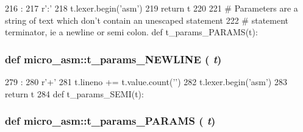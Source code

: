 \begin{DoxyCode}
216                      :
217     r':'
218     t.lexer.begin('asm')
219     return t
220 
221 # Parameters are a string of text which don't contain an unescaped statement
222 # statement terminator, ie a newline or semi colon.
def t_params_PARAMS(t):
\end{DoxyCode}
\hypertarget{namespacemicro__asm_a466b4ac51d5f9226e723240cdb1b809d}{
\subsubsection[{t\_\-params\_\-NEWLINE}]{\setlength{\rightskip}{0pt plus 5cm}def micro\_\-asm::t\_\-params\_\-NEWLINE ( {\em t})}}
\label{namespacemicro__asm_a466b4ac51d5f9226e723240cdb1b809d}



\begin{DoxyCode}
279                        :
280     r'\n+'
281     t.lineno += t.value.count('\n')
282     t.lexer.begin('asm')
283     return t
284 
def t_params_SEMI(t):
\end{DoxyCode}
\hypertarget{namespacemicro__asm_a95021a4fe487544ac75a27dd642332bc}{
\subsubsection[{t\_\-params\_\-PARAMS}]{\setlength{\rightskip}{0pt plus 5cm}def micro\_\-asm::t\_\-params\_\-PARAMS ( {\em t})}}
\label{namespacemicro__asm_a95021a4fe487544ac75a27dd642332bc}



